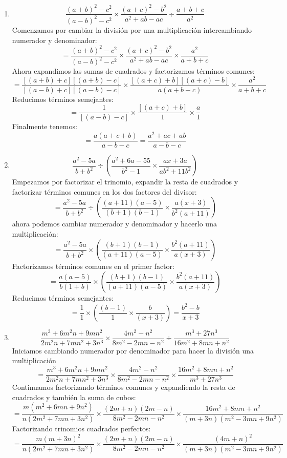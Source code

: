 \documentclass[12pt]{article}
\begin{document}
\begin{enumerate}[label=\bfseries Ejercicio \arabic*:]
  \item $$\frac{(a + b)^2 - c^2}{(a - b)^2 - c^2} \times \frac{(a + c)^2 -b^2}{a^2 + ab -ac} \div \frac{a + b+ c}{a^2}$$
Comenzamos por cambiar la división por una multiplicación intercambiando numerador y denominador:
$$= \frac{(a + b)^2 - c^2}{(a - b)^2 - c^2} \times \frac{(a + c)^2 -b^2}{a^2 + ab -ac} \times \frac{a^2}{a + b+ c}$$
Ahora expandimos las sumas de cuadrados y factorizamos términos comunes:
$$= \frac{[(a+ b) + c][(a+ b) - c]}{[(a - b) + c][(a - b) - c]} \times \frac{[(a + c) + b][(a + c) - b]}{a(a + b - c)} \times \frac{a^2}{a + b+ c}$$
Reducimos términos semejantes:
$$= \frac{1}{[(a - b) - c]} \times \frac{[(a + c) + b]}{1} \times \frac{a}{1}$$
Finalmente tenemos:
$$= \frac{a(a + c + b)}{a - b - c} = \frac{a^2 + ac + ab}{a - b - c}$$
  \item  $$\frac{a^2 - 5a}{b + b^2} \div \left( \frac{a^2 + 6a - 55}{b^2 - 1} \times \frac{ax + 3a}{ab^2 + 11b^2} \right)$$
Empezamos por factorizar el trinomio, expandir la resta de cuadrados y factorizar términos comunes en los dos factores del divisor:
$$= \frac{a^2 - 5a}{b + b^2} \div \left( \frac{(a + 11)(a - 5)}{(b+1)(b - 1)} \times \frac{a(x + 3)}{b^2(a + 11)} \right)$$
ahora podemos cambiar numerador y denominador y hacerlo una multiplicación:
$$= \frac{a^2 - 5a}{b + b^2} \times \left( \frac{(b+1)(b - 1)}{(a + 11)(a - 5)} \times \frac{b^2(a + 11)}{a(x + 3)} \right)$$
Factorizamos términos comunes en el primer factor:
$$= \frac{a(a - 5)}{b(1 + b)} \times \left( \frac{(b+1)(b - 1)}{(a + 11)(a - 5)} \times \frac{b^2(a + 11)}{a(x + 3)} \right)$$
Reducimos términos semejantes:
$$= \frac{1}{1} \times \left( \frac{(b - 1)}{1} \times \frac{b}{(x + 3)} \right) = \frac{b^2 - b}{x + 3}$$
  \item $$\frac{m^3 + 6m^2n + 9mn^2}{2m^2n + 7 mn^2 + 3n^3} \times \frac{4m^2 - n^2}{8m^2 - 2mn -n^2} \div \frac{m^3 + 27n^3}{16m^2 + 8mn +n^2}$$
Iniciamos cambiando numerador por denominador para hacer la división una multiplicación
$$= \frac{m^3 + 6m^2n + 9mn^2}{2m^2n + 7 mn^2 + 3n^3} \times \frac{4m^2 - n^2}{8m^2 - 2mn -n^2} \times \frac{16m^2 + 8mn +n^2}{m^3 + 27n^3}$$
Continuamos factorizando términos comunes y expandiendo la resta de cuadrados y también la suma de cubos:
$$= \frac{m(m^2 + 6mn + 9n^2)}{n(2m^2 + 7 mn + 3n^2)} \times \frac{(2m + n)(2m - n)}{8m^2 - 2mn -n^2} \times \frac{16m^2 + 8mn +n^2}{(m + 3n)(m^2 - 3mn + 9n^2)}$$
Factorizando trinomios cuadrados perfectos:
$$= \frac{m(m + 3n)^2}{n(2m^2 + 7mn + 3n^2)} \times \frac{(2m + n)(2m - n)}{8m^2 - 2mn - n^2} \times \frac{(4m + n)^2}{(m + 3n)(m^2 - 3mn + 9n^2)}$$

\end{enumerate}
\end{document}
